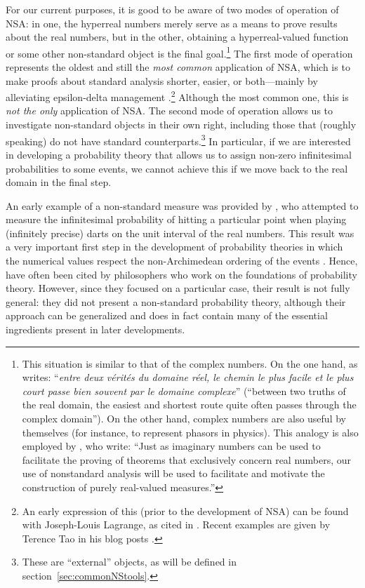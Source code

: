 For our current purposes, it is good to be aware of two modes of operation of NSA: in one, the hyperreal numbers merely serve as a means to prove results about the real numbers, but in the other, obtaining a hyperreal-valued function or some other non-standard object is the final goal.\footnote{This situation is similar to that of the complex numbers. On the one hand, as \citet[pp.~1--2]{Painleve:1967} writes: ``\textit{entre deux v{\'{e}}rit{\'{e}}s du domaine r{\'{e}}el, le chemin le plus facile et le plus court passe bien souvent par le domaine complexe}'' (``between two truths of the real domain, the easiest and shortest route quite often passes through the complex domain''). On the other hand, complex numbers are also useful by themselves (for instance, to represent phasors in physics).
This analogy is also employed by \citet[p.~416]{BarthaHitchcock:1999}, who write: ``Just as imaginary numbers can be used to facilitate the proving of theorems that exclusively concern real numbers, our use of nonstandard analysis will be used to facilitate and motivate the construction of purely real-valued measures.''}
The first mode of operation represents the oldest and still the \emph{most common} application of NSA, which is to make proofs about standard analysis shorter, easier, or both---mainly by alleviating epsilon-delta management \citep{Tao:2007}.\footnote{An early expression of this (prior to the development of NSA) can be found with Joseph-Louis Lagrange, as cited in \citet[p.~63]{Blaszczyk_etal:2013}. Recent examples are given by Terence Tao in his blog posts \citep[see, \textit{e.g.},][]{Tao:2007-2012}.} Although the most common one, this is \emph{not the only} application of NSA.
The second mode of operation allows us to investigate non-standard objects in their own right, including those that (roughly speaking) do not have standard counterparts.\footnote{These are ``external'' objects, as will be defined in section~\ref{sec:commonNStools}.} In particular, if we are interested in developing a probability theory that allows us to assign non-zero infinitesimal probabilities to some events, we cannot achieve this if we move back to the real domain in the final step.

An early example of a non-standard measure was provided by \citet{BernsteinWattenberg:1969}, who attempted to measure the infinitesimal probability of hitting a particular point when playing (infinitely precise) darts on the unit interval of the real numbers. This result was a very important first step in the development of probability theories in which the numerical values respect the non-Archimedean ordering of the events \citep[as studied by~][]{deFinetti:1936}. Hence, \citet{BernsteinWattenberg:1969} have often been cited by philosophers who work on the foundations of probability theory. However, since they focused on a particular case, their result is not fully general: they did not present a non-standard probability theory, although their approach can be generalized and does in fact contain many of the essential ingredients present in later developments.

